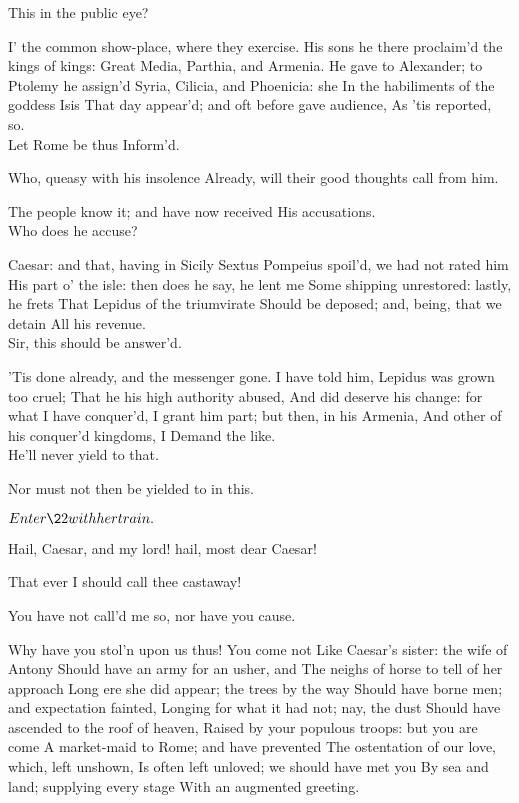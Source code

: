 \documentclass{book}
\begin{document}
	                  This in the public eye?

\3	I' the common show-place, where they exercise.
	His sons he there proclaim'd the kings of kings:
	Great Media, Parthia, and Armenia.
	He gave to Alexander; to Ptolemy he assign'd
	Syria, Cilicia, and Phoenicia: she
	In the habiliments of the goddess Isis
	That day appear'd; and oft before gave audience,
	As 'tis reported, so. \\

	Let Rome be thus Inform'd.

\4	Who, queasy with his insolence
	Already, will their good thoughts call from him.

\3	The people know it; and have now received
	His accusations. \\

\4	                  Who does he accuse?

\3	Caesar: and that, having in Sicily
	Sextus Pompeius spoil'd, we had not rated him
	His part o' the isle: then does he say, he lent me
	Some shipping unrestored: lastly, he frets
	That Lepidus of the triumvirate
	Should be deposed; and, being, that we detain
	All his revenue. \\

\4	                  Sir, this should be answer'd.

\3	'Tis done already, and the messenger gone.
	I have told him, Lepidus was grown too cruel;
	That he his high authority abused,
	And did deserve his change: for what I have conquer'd,
	I grant him part; but then, in his Armenia,
	And other of his conquer'd kingdoms, I
	Demand the like. \\

	                  He'll never yield to that.

\3	Nor must not then be yielded to in this.


	\(Enter \22 with her train.\)

	Hail, Caesar, and my lord! hail, most dear Caesar!

\3	That ever I should call thee castaway!

	You have not call'd me so, nor have you cause.

\3	Why have you stol'n upon us thus! You come not
	Like Caesar's sister: the wife of Antony
	Should have an army for an usher, and
	The neighs of horse to tell of her approach
	Long ere she did appear; the trees by the way
	Should have borne men; and expectation fainted,
	Longing for what it had not; nay, the dust
	Should have ascended to the roof of heaven,
	Raised by your populous troops: but you are come
	A market-maid to Rome; and have prevented
	The ostentation of our love, which, left unshown,
	Is often left unloved; we should have met you
	By sea and land; supplying every stage
	With an augmented greeting. \\
\end{document}
